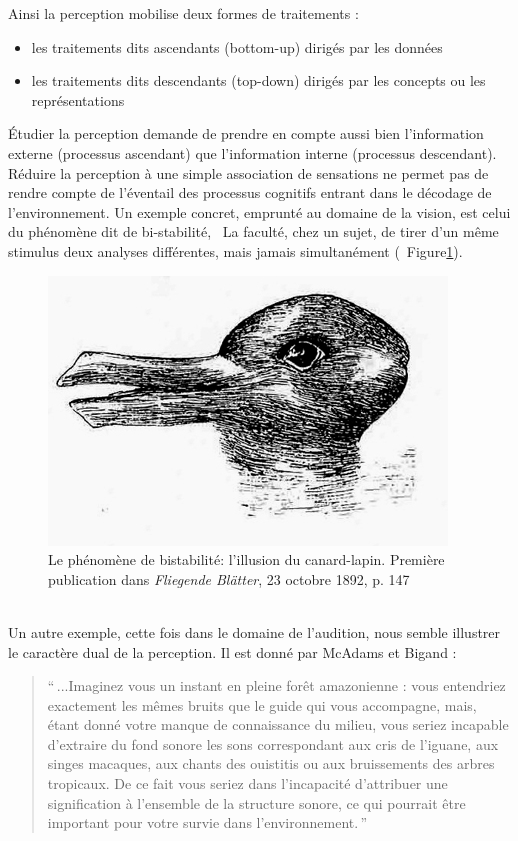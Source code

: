 Ainsi la perception mobilise deux formes de traitements :

\begin{itemize}
\item les traitements dits ascendants (bottom-up) dirigés par les données
\item les traitements dits descendants (top-down) dirigés par les concepts ou les représentations
\end{itemize}

Étudier la perception demande de prendre en compte aussi bien l'information externe (processus ascendant) que l'information interne (processus descendant). Réduire la perception à une simple association de sensations ne permet pas de rendre compte de l'éventail des processus cognitifs entrant dans le décodage de l'environnement. Un exemple concret, emprunté au domaine de la vision, est celui du phénomène dit de bi-stabilité, \ie~La faculté, chez un sujet, de tirer d'un même stimulus deux analyses différentes, mais jamais simultanément (\Cf~Figure\ref{fig:bistabilite}). \\

\begin{figure}[bth]
        \myfloatalign
        \includegraphics[width=.6\linewidth]{gfx/canard_lapin}
        \caption[Le phénomène de bistabilité: l'illusion du canard-lapin]{Le phénomène de bistabilité: l'illusion du canard-lapin. Première publication dans \emph{Fliegende Blätter}, 23 octobre 1892, p. 147}\label{fig:bistabilite}
\end{figure}

\\

Un autre exemple, cette fois dans le domaine de l'audition, nous semble illustrer le caractère dual de la perception. Il est donné par McAdams et Bigand \citep[p. 2]{mcadams1994penser}:

\begin{quote}
``\,...Imaginez vous un instant en pleine forêt amazonienne : vous entendriez exactement les mêmes bruits que le guide qui vous accompagne, mais, étant donné votre manque de connaissance du milieu, vous seriez incapable d'extraire du fond sonore les sons correspondant aux cris de l'iguane, aux singes macaques, aux chants des ouistitis ou aux bruissements des arbres tropicaux. De ce fait vous seriez dans l'incapacité d'attribuer une signification à l'ensemble de la structure sonore, ce qui pourrait être important pour votre survie dans l'environnement.\,''
\end{quote}


